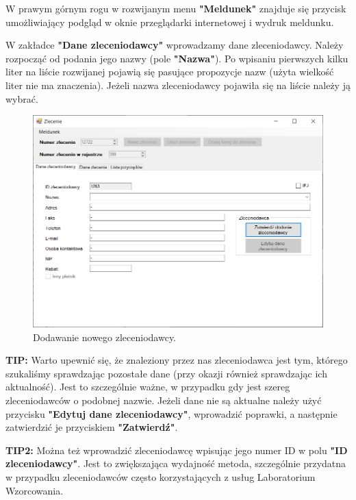 W prawym górnym rogu w rozwijanym menu \textbf{"Meldunek"} znajduje się przycisk umożliwiający podgląd w oknie przeglądarki internetowej i wydruk meldunku.

W zakładce \textbf{"Dane zleceniodawcy"} wprowadzamy dane zleceniodawcy. Należy rozpocząć od podania jego nazwy (pole \textbf{"Nazwa"}). Po wpisaniu pierwszych kilku liter na liście rozwijanej pojawią się pasujące propozycje nazw (użyta wielkość liter nie ma znaczenia). Jeżeli nazwa zleceniodawcy pojawiła się na liście należy ją wybrać. 

\begin{figure}[htb]
	\centering
	\includegraphics[width=\columnwidth]{obrazki/Biuro/zlecenie/zlecenie_dodanie_zleceniodawcy.png}
	\caption{Dodawanie nowego zleceniodawcy.}
	\label{zlecenieDodanieZleceniodawcy}
\end{figure}

\textbf{TIP:} Warto upewnić się, że znaleziony przez nas zleceniodawca jest tym, którego szukaliśmy sprawdzając pozostałe dane (przy okazji również sprawdzając ich aktualność). Jest to szczególnie ważne, w przypadku gdy jest szereg zleceniodawców o podobnej nazwie. Jeżeli dane nie są aktualne należy użyć przycisku \textbf{"Edytuj dane zleceniodawcy"}, wprowadzić poprawki, a następnie zatwierdzić je przyciskiem \textbf{"Zatwierdź"}.

\textbf{TIP2:} Można też wprowadzić zleceniodawcę wpisując jego numer ID w polu \textbf{"ID zleceniodawcy"}. Jest to zwiększająca wydajność metoda, szczególnie przydatna w przypadku zleceniodawców często korzystających z usług Laboratorium Wzorcowania.

